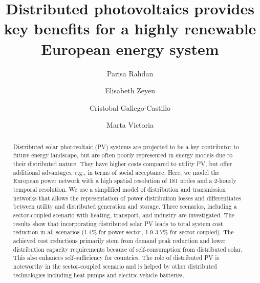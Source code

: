 \documentclass[review]{elsarticle}
\begin{document}
	
	\begin{frontmatter}
		
		\title{Distributed photovoltaics provides key benefits for a highly renewable European energy system
		}
		
		\author[mpe]{Parisa Rahdan  }
		\author[TUB]{Elisabeth Zeyen}   %
		\author[upm]{Cristobal Gallego-Castillo}
		\author[mpe,novo]{Marta Victoria}
		
		
		
		
		
		
		
		\begin{abstract}
			
			Distributed solar photovoltaic (PV) systems are projected to be a key contributor to future energy landscape, but are often poorly represented in energy models due to their distributed nature. They have higher costs compared to utility PV, but offer additional advantages, e.g., in terms of social acceptance. Here, we model the European power network with a high spatial resolution of 181 nodes and a 2-hourly temporal resolution. We use a simplified model of distribution and transmission networks that allows the representation of power distribution losses and differentiates between utility and distributed generation and storage. Three scenarios, including a sector-coupled scenario with heating, transport, and industry are investigated. The results show that incorporating distributed solar PV leads to total system cost reduction in all scenarios (1.4\% for power sector, 1.9-3.7\% for sector-coupled). The achieved cost reductions primarily stem from demand peak reduction and lower distribution capacity requirements because of self-consumption from distributed solar. This also enhances self-sufficiency for countries. The role of distributed PV is noteworthy in the sector-coupled scenario and is helped by other distributed technologies including heat pumps and electric vehicle batteries.
		\end{abstract}
		

\end{frontmatter}
\end{document}
